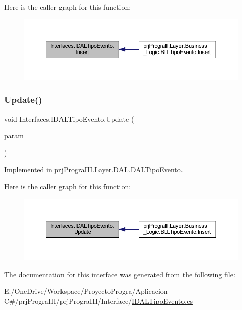 Here is the caller graph for this function\+:
\nopagebreak
\begin{figure}[H]
\begin{center}
\leavevmode
\includegraphics[width=350pt]{interface_interfaces_1_1_i_d_a_l_tipo_evento_ac9cd8048199f2db94302ae677629a531_icgraph}
\end{center}
\end{figure}
\hypertarget{interface_interfaces_1_1_i_d_a_l_tipo_evento_a2aec87a149b0edd203803576be6946d0}{}\label{interface_interfaces_1_1_i_d_a_l_tipo_evento_a2aec87a149b0edd203803576be6946d0} 
\subsubsection{\texorpdfstring{Update()}{Update()}}
{\footnotesize\ttfamily void Interfaces.\+I\+D\+A\+L\+Tipo\+Evento.\+Update (\begin{DoxyParamCaption}\item[{\hyperlink{classprj_progra_i_i_i_1_1_layer_1_1_entities_1_1_tipo_evento}{Tipo\+Evento}}]{param }\end{DoxyParamCaption})}



Implemented in \hyperlink{classprj_progra_i_i_i_1_1_layer_1_1_d_a_l_1_1_d_a_l_tipo_evento_a1265817c512c688caab86130dd21b39a}{prj\+Progra\+I\+I\+I.\+Layer.\+D\+A\+L.\+D\+A\+L\+Tipo\+Evento}.

Here is the caller graph for this function\+:
\nopagebreak
\begin{figure}[H]
\begin{center}
\leavevmode
\includegraphics[width=350pt]{interface_interfaces_1_1_i_d_a_l_tipo_evento_a2aec87a149b0edd203803576be6946d0_icgraph}
\end{center}
\end{figure}


The documentation for this interface was generated from the following file\+:\begin{DoxyCompactItemize}
\item 
E\+:/\+One\+Drive/\+Workspace/\+Proyecto\+Progra/\+Aplicacion C\#/prj\+Progra\+I\+I\+I/prj\+Progra\+I\+I\+I/\+Interface/\hyperlink{_i_d_a_l_tipo_evento_8cs}{I\+D\+A\+L\+Tipo\+Evento.\+cs}\end{DoxyCompactItemize}
